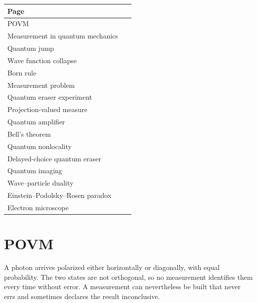 \documentclass[11pt,oneside]{book}
\begin{document}
\begin{longtable}{p{0.92\linewidth}}
\toprule
Page \\
\midrule
\endhead
{}\label{page:povm}POVM \\
\label{page:measurement-in-quantum-mechanics}Measurement in quantum mechanics \\
\label{page:quantum-jump}Quantum jump \\
\label{page:wave-function-collapse}Wave function collapse \\
\label{page:born-rule}Born rule \\
\label{page:measurement-problem}Measurement problem \\
\label{page:quantum-eraser-experiment}Quantum eraser experiment \\
\label{page:projection-valued-measure}Projection-valued measure \\
\label{page:quantum-amplifier}Quantum amplifier \\
\label{page:bell-s-theorem}Bell's theorem \\
\label{page:quantum-nonlocality}Quantum nonlocality \\
\label{page:delayed-choice-quantum-eraser}Delayed-choice quantum eraser \\
\label{page:quantum-imaging}Quantum imaging \\
\label{page:wave-particle-duality}Wave–particle duality \\
\label{page:einstein-podolsky-rosen-paradox}Einstein–Podolsky–Rosen paradox \\
\label{page:electron-microscope}Electron microscope \\
\bottomrule
\end{longtable}

\clearpage

\section{POVM}

\label{topic:povm}

A photon arrives polarized either horizontally or diagonally, with equal probability. The two states are not orthogonal, so no measurement identifies them every time without error. A measurement can nevertheless be built that never errs and sometimes declares the result inconclusive.
\end{document}
